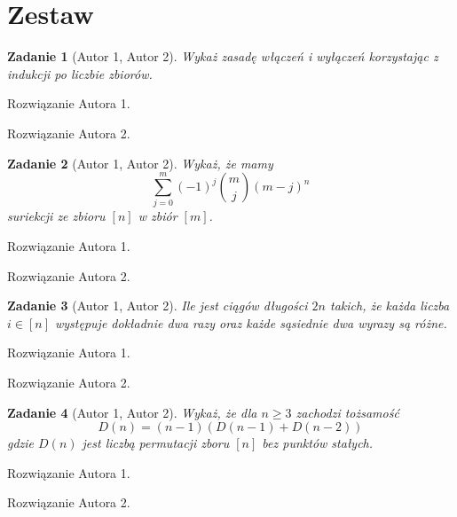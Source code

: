 \documentclass{mwart}
\newtheorem{zad}{Zadanie}[section]
\begin{document}
\newpage
\section{Zestaw}          %

\begin{zad}[Autor 1, Autor 2]
    Wykaż zasadę włączeń i wyłączeń korzystając z indukcji po liczbie zbiorów.
\end{zad}
\begin{mdframed}
    Rozwiązanie Autora 1.
\end{mdframed}
\begin{mdframed}
    Rozwiązanie Autora 2.
\end{mdframed}




\begin{zad}[Autor 1, Autor 2]
    Wykaż, że mamy
    \[
        \sum_{j=0}^{m}(-1)^j \binom{m}{j}(m-j)^n
    \]
    suriekcji ze zbioru $[n]$ w zbiór $[m]$.
\end{zad}
\begin{mdframed}
    Rozwiązanie Autora 1.
\end{mdframed}
\begin{mdframed}
    Rozwiązanie Autora 2.
\end{mdframed}



\begin{zad}[Autor 1, Autor 2]
    Ile jest ciągów długości $2n$ takich, że każda liczba $i \in [n]$
    występuje dokładnie dwa razy oraz każde sąsiednie dwa wyrazy są różne.
\end{zad}
\begin{mdframed}
    Rozwiązanie Autora 1.
\end{mdframed}
\begin{mdframed}
    Rozwiązanie Autora 2.
\end{mdframed}




\begin{zad}[Autor 1, Autor 2]
    Wykaż, że dla $n \geq 3$ zachodzi tożsamość
    \[
        D(n) = (n-1)(D(n-1) + D(n-2))
    \]
    gdzie $D(n)$ jest liczbą permutacji zboru $[n]$ bez punktów stałych.
\end{zad}
\begin{mdframed}
    Rozwiązanie Autora 1.
\end{mdframed}
\begin{mdframed}
    Rozwiązanie Autora 2.
\end{mdframed}
\end{document}
